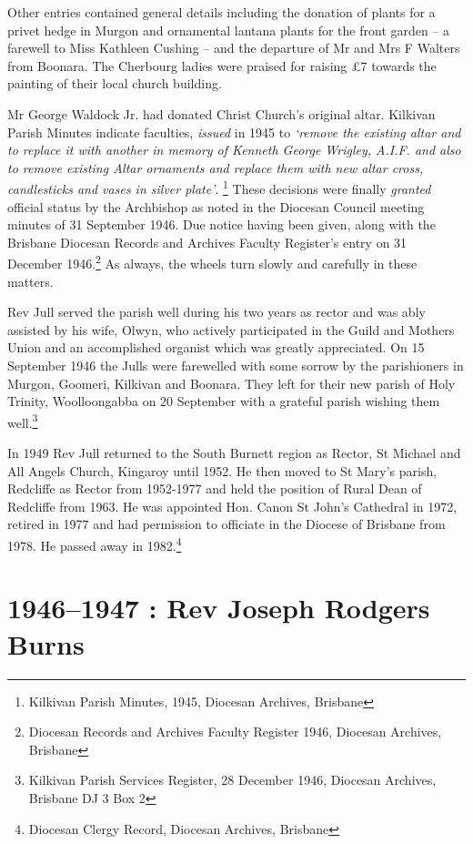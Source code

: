 Other entries contained general details including the donation of plants for a privet hedge in Murgon and ornamental lantana plants for the front garden -- a farewell to Miss Kathleen Cushing -- and the departure of Mr and Mrs F Walters from Boonara. The Cherbourg ladies were praised for raising £7 towards the painting of their local church building.

Mr George Waldock Jr. had donated Christ Church's original altar. Kilkivan Parish Minutes indicate faculties, \emph{issued} in 1945 to \emph{`remove the existing altar and to replace it with another in memory of Kenneth George Wrigley, A.I.F. and also to remove existing Altar ornaments and replace them with new altar cross, candlesticks and vases in silver plate'}. \footnote{Kilkivan Parish Minutes, 1945, Diocesan Archives, Brisbane} These decisions were finally \emph{granted} official status by the Archbishop as noted in the Diocesan Council meeting minutes of 31 September 1946. Due notice having been given, along with the Brisbane Diocesan Records and Archives Faculty Register's entry on 31 December 1946.\footnote{Diocesan Records and Archives Faculty Register 1946, Diocesan Archives, Brisbane} As always, the wheels turn slowly and carefully in these matters.

Rev Jull served the parish well during his two years as rector and was ably assisted by his wife, Olwyn, who actively participated in the Guild and Mothers Union and an accomplished organist which was greatly appreciated. On 15 September 1946 the Julls were farewelled with some sorrow by the parishioners in Murgon, Goomeri, Kilkivan and Boonara. They left for their new parish of Holy Trinity, Woolloongabba on 20 September with a grateful parish wishing them well.\footnote{Kilkivan Parish Services Register, 28 December 1946, Diocesan Archives, Brisbane DJ 3 Box 2}

In 1949 Rev Jull returned to the South Burnett region as Rector, St Michael and All Angels Church, Kingaroy until 1952. He then moved to St Mary's parish, Redcliffe as Rector from 1952-1977 and held the position of Rural Dean of Redcliffe from 1963. He was appointed Hon. Canon St John's Cathedral in 1972, retired in 1977 and had permission to officiate in the Diocese of Brisbane from 1978. He passed away in 1982.\footnote{Diocesan Clergy Record, Diocesan Archives, Brisbane}

\hypertarget{rev-joseph-rodgers-burns}{%
\section{1946--1947 : Rev Joseph Rodgers Burns}\label{rev-joseph-rodgers-burns}}

